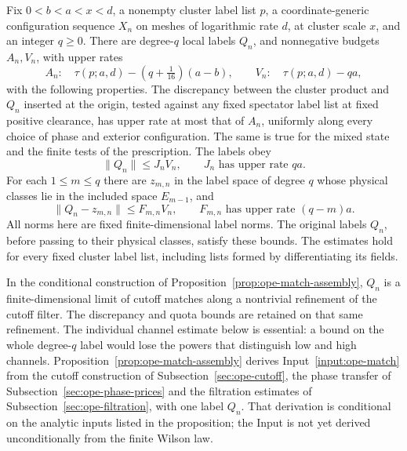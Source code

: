 \begin{assumption}\label{input:ope-match}
Fix $0<b<a<x<d$, a nonempty cluster label list $p$, a
coordinate-generic configuration sequence $X_n$ on meshes of logarithmic
rate $d$, at cluster scale $x$, and an integer $q\geq0$.
There are degree-$q$ local labels $Q_n$, and nonnegative budgets $A_n,V_n$,
with upper rates
\[
 A_n:\quad\tau(p;a,d)-(q+\tfrac1{16})(a-b),\qquad
 V_n:\quad\tau(p;a,d)-qa,
\]
with the following properties. The discrepancy between the cluster
product and $Q_n$ inserted at the origin, tested against any fixed
spectator label list at fixed positive clearance, has upper rate at
most that of $A_n$, uniformly along every choice of phase and exterior
configuration. The same is true for the mixed state and the finite tests
of the prescription. The labels obey
\begin{equation}\label{eq:ope-match-norm}
 \|Q_n\|\leq J_n V_n,\qquad J_n\text{ has upper rate }qa.
\end{equation}
For each $1\leq m\leq q$ there are $z_{m,n}$ in the label space of
degree $q$ whose physical classes lie in the included space $E_{m-1}$,
and
\begin{equation}\label{eq:ope-match-distance}
 \|Q_n-z_{m,n}\|\leq F_{m,n}V_n,
 \qquad F_{m,n}\text{ has upper rate }(q-m)a.
\end{equation}
All norms here are fixed finite-dimensional label norms. The original
labels $Q_n$, before passing to their physical classes, satisfy these
bounds. The estimates hold for every fixed cluster label list, including
lists formed by differentiating its fields.
\end{assumption}
In the conditional construction of Proposition~\ref{prop:ope-match-assembly},
$Q_n$ is a finite-dimensional limit of cutoff matches along a nontrivial
refinement of the cutoff filter. The discrepancy and quota bounds are retained
on that same refinement. The individual channel estimate below is essential: a bound on the
whole degree-$q$ label would lose the powers that distinguish low and
high channels. Proposition~\ref{prop:ope-match-assembly} derives
Input~\ref{input:ope-match} from the cutoff construction of
Subsection~\ref{sec:ope-cutoff}, the phase transfer of
Subsection~\ref{sec:ope-phase-prices} and the filtration estimates of
Subsection~\ref{sec:ope-filtration}, with one label $Q_n$. That derivation
is conditional on the analytic inputs listed in the proposition; the
Input is not yet derived unconditionally from the finite Wilson law.

